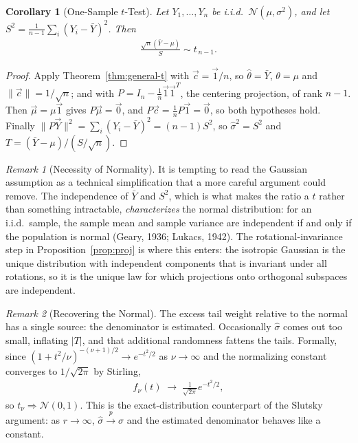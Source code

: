 \documentclass[11pt]{article}
\theoremstyle{definition}
\theoremstyle{plain}
\newtheorem{corollary}{Corollary}[section]
\theoremstyle{remark}
\newtheorem{remark}{Remark}[section]
\begin{document}
\begin{corollary}[One-Sample $t$-Test]
    Let $Y_1,\dots,Y_n$ be i.i.d.\ $\mathcal{N}(\mu,\sigma^2)$, and let $S^2 = \frac{1}{n-1}\sum_i (Y_i - \bar{Y})^2$. Then
    \begin{align}
        \frac{\sqrt{n}\left(\bar{Y}-\mu\right)}{S} \sim t_{\,n-1}.
    \end{align}
\end{corollary}
\begin{proof}
    Apply Theorem~\ref{thm:general-t} with $\vec{c} = \vec{1}/n$, so $\hat{\theta} = \bar{Y}$, $\theta = \mu$ and $\|\vec{c}\| = 1/\sqrt{n}$; and with $P = I_n - \frac{1}{n}\vec{1}\vec{1}^T$, the centering projection, of rank $n-1$. Then $\vec{\mu} = \mu\vec{1}$ gives $P\vec{\mu} = \vec{0}$, and $P\vec{c} = \frac{1}{n}P\vec{1} = \vec{0}$, so both hypotheses hold. Finally $\|P\vec{Y}\|^2 = \sum_i (Y_i-\bar{Y})^2 = (n-1)S^2$, so $\hat{\sigma}^2 = S^2$ and $T = (\bar{Y}-\mu)/(S/\sqrt{n})$.
\end{proof}

\begin{remark}[Necessity of Normality]
    It is tempting to read the Gaussian assumption as a technical simplification that a more careful argument could remove. The independence of $\bar{Y}$ and $S^2$, which is what makes the ratio a $t$ rather than something intractable, \emph{characterizes} the normal distribution: for an i.i.d.\ sample, the sample mean and sample variance are independent if and only if the population is normal (Geary, 1936; Lukacs, 1942). The rotational-invariance step in Proposition~\ref{prop:proj} is where this enters: the isotropic Gaussian is the unique distribution with independent components that is invariant under all rotations, so it is the unique law for which projections onto orthogonal subspaces are independent.
\end{remark}

\begin{remark}[Recovering the Normal]
    The excess tail weight relative to the normal has a single source: the denominator is estimated. Occasionally $\hat{\sigma}$ comes out too small, inflating $|T|$, and that additional randomness fattens the tails. Formally, since $(1+t^2/\nu)^{-(\nu+1)/2} \to e^{-t^2/2}$ as $\nu\to\infty$ and the normalizing constant converges to $1/\sqrt{2\pi}$ by Stirling,
    \begin{align}
        f_\nu(t) \;\longrightarrow\; \frac{1}{\sqrt{2\pi}}e^{-t^2/2},
    \end{align}
    so $t_\nu \Rightarrow \mathcal{N}(0,1)$. This is the exact-distribution counterpart of the Slutsky argument: as $r\to\infty$, $\hat{\sigma}\xrightarrow{p}\sigma$ and the estimated denominator behaves like a constant.
\end{remark}
\end{document}
